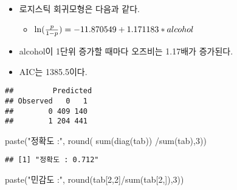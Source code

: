 \documentclass[
]{article}
\newenvironment{Shaded}{\begin{snugshade}}{\end{snugshade}}
\newcommand{\AttributeTok}[1]{\textcolor[rgb]{0.77,0.63,0.00}{#1}}
\newcommand{\DecValTok}[1]{\textcolor[rgb]{0.00,0.00,0.81}{#1}}
\newcommand{\FloatTok}[1]{\textcolor[rgb]{0.00,0.00,0.81}{#1}}
\newcommand{\FunctionTok}[1]{\textcolor[rgb]{0.00,0.00,0.00}{#1}}
\newcommand{\NormalTok}[1]{#1}
\newcommand{\OtherTok}[1]{\textcolor[rgb]{0.56,0.35,0.01}{#1}}
\newcommand{\SpecialCharTok}[1]{\textcolor[rgb]{0.00,0.00,0.00}{#1}}
\newcommand{\StringTok}[1]{\textcolor[rgb]{0.31,0.60,0.02}{#1}}
\providecommand{\tightlist}{%
  \setlength{\itemsep}{0pt}\setlength{\parskip}{0pt}}
\begin{document}
\begin{itemize}
\tightlist
\item
  로지스틱 회귀모형은 다음과 같다.

  \begin{itemize}
  \tightlist
  \item
    \(\ln({p \over 1-p}) = -11.870549 + 1.171183 * alcohol\)
  \end{itemize}
\item
  alcohol이 1단위 증가할 때마다 오즈비는 1.17배가 증가된다.
\item
  AIC는 1385.5이다.
\end{itemize}

\begin{Shaded}
\end{Shaded}

\begin{verbatim}
##         Predicted
## Observed   0   1
##        0 409 140
##        1 204 441
\end{verbatim}

\begin{Shaded}
\begin{Highlighting}[]
\FunctionTok{paste}\NormalTok{(}\StringTok{"정확도 :"}\NormalTok{, }\FunctionTok{round}\NormalTok{( }\FunctionTok{sum}\NormalTok{(}\FunctionTok{diag}\NormalTok{(tab)) }\SpecialCharTok{/}\FunctionTok{sum}\NormalTok{(tab),}\DecValTok{3}\NormalTok{))}
\end{Highlighting}
\end{Shaded}

\begin{verbatim}
## [1] "정확도 : 0.712"
\end{verbatim}

\begin{Shaded}
\begin{Highlighting}[]
\FunctionTok{paste}\NormalTok{(}\StringTok{"민감도 :"}\NormalTok{, }\FunctionTok{round}\NormalTok{(tab[}\DecValTok{2}\NormalTok{,}\DecValTok{2}\NormalTok{]}\SpecialCharTok{/}\FunctionTok{sum}\NormalTok{(tab[}\DecValTok{2}\NormalTok{,]),}\DecValTok{3}\NormalTok{))}
\end{Highlighting}
\end{Shaded}
\end{document}
